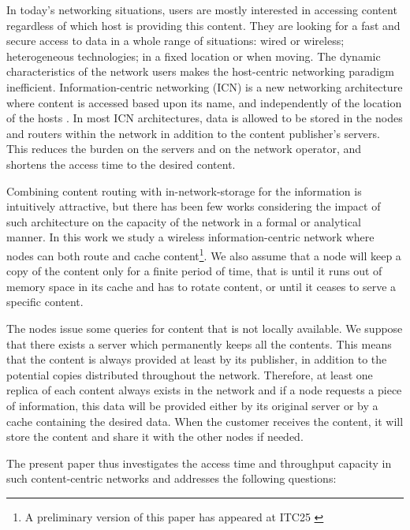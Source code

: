 \documentclass[journal]{IEEEtran}
\theoremstyle{plain}
\theoremstyle{remark}
\begin{document}
In today's networking situations, users are mostly interested in accessing content regardless of which host is providing this content. They are looking for a fast and secure access to data in a whole range of situations: wired or wireless; heterogeneous technologies; in a fixed location or when moving. The dynamic characteristics of the network users makes the host-centric networking paradigm inefficient. Information-centric networking (ICN) is a new networking architecture where content is accessed based upon its name, and independently of the location of the hosts \cite{Zhang2010Named,Pursuit,Ahlgren2012Survey,Jacobson2009Networking}. In most ICN architectures, data is allowed to be stored in the nodes and routers within the network in addition to the content publisher's servers. This reduces the burden on the servers and on the network operator, and shortens the access time to the desired content.

Combining content routing with in-network-storage for the information is intuitively attractive, but there has been few works considering the impact of such architecture on the capacity of the network in a formal or analytical manner. In this work we study a wireless information-centric network where nodes can both route and cache content\footnote{A preliminary version of this paper has appeared at ITC25 \cite{Azimdoost2013Throughput}}. We also assume that a node will keep a copy of the content only for a finite period of time, that is until it runs out of memory space in its cache and has to rotate content, or until it ceases to serve a specific content.

The nodes issue some queries for content that is not locally available. We suppose that there exists a server which permanently keeps all the contents. This means that the content is always provided at least by its publisher, in addition to the potential copies distributed throughout the network. Therefore, at least one replica of each content always exists in the network and if a node requests a piece of information, this data will be provided either by its original server or by a cache containing the desired data. When the customer receives the content, it will store the content and share it with the other nodes if needed.

The present paper thus investigates the access time and throughput capacity in such content-centric networks and addresses the following questions:
\end{document}
